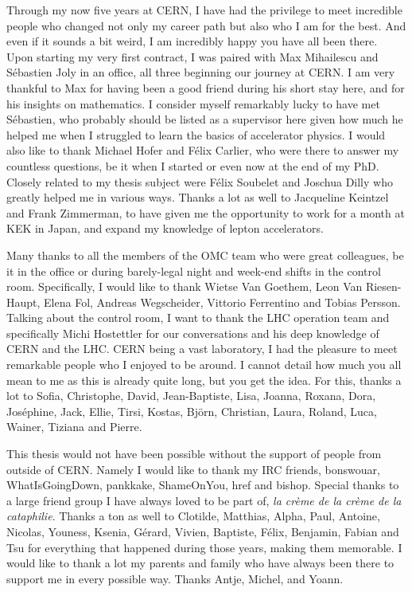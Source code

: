 {Through my now five years at CERN, I have had the privilege to meet incredible people who changed
not only my career path but also who I am for the best. And even if it sounds a bit weird, I am
incredibly happy you have all been there.\\
\indent
Upon starting my very first contract, I was paired with Max Mihailescu and Sébastien Joly in an
office, all three beginning our journey at CERN. I am very thankful to Max for having been a good
friend during his short stay here, and for his insights on mathematics. I consider myself
remarkably lucky to have met Sébastien, who probably should be listed as a supervisor here given how 
much he helped me when I struggled to learn the basics of accelerator physics.
I would also like to thank Michael Hofer and Félix Carlier, who were there to answer my countless
questions, be it when I started or even now at the end of my PhD.
Closely related to my thesis subject were Félix Soubelet and Joschua Dilly who greatly helped me in
various ways.
Thanks a lot as well to Jacqueline Keintzel and Frank Zimmerman, to have given me the opportunity to
work for a month at KEK in Japan, and expand my knowledge of lepton accelerators. 

Many thanks to all the members of the OMC team who were great colleagues, be it in the office or
during barely-legal night and week-end shifts in the control room. Specifically, I would like to
thank Wietse Van Goethem, Leon Van Riesen-Haupt, Elena Fol, Andreas Wegscheider, Vittorio Ferrentino
and Tobias Persson. Talking about the control room, I want to thank the LHC operation team and
specifically Michi Hostettler for our conversations and his deep knowledge of CERN and the LHC.
\noindent
CERN being a vast laboratory, I had the pleasure to meet remarkable people who I enjoyed to be
around. I cannot detail how much you all mean to me as this is already quite long, but you get the 
idea. For this, thanks a lot to Sofia, Christophe, David, Jean-Baptiste, Lisa, Joanna, Roxana, Dora,
Joséphine, Jack, Ellie, Tirsi, Kostas, Björn, Christian, Laura, Roland, Luca, Wainer, Tiziana and
Pierre.

This thesis would not have been possible without the support of people from outside of CERN. Namely
I would like to thank my IRC friends, bonswouar, WhatIsGoingDown, pankkake, ShameOnYou, href and
bishop. Special thanks to a large friend group I have always loved to be part of, \textit{la crème
de la crème de la cataphilie}.
Thanks a ton as well to Clotilde, Matthias, Alpha, Paul, Antoine, Nicolas, Youness, Ksenia, Gérard, Vivien,
Baptiste, Félix, Benjamin, Fabian and Tsu for everything that happened during those years,
making them memorable.
I would like to thank a lot my parents and family who have always been there to support me in every
possible way. Thanks Antje, Michel, and Yoann.

}